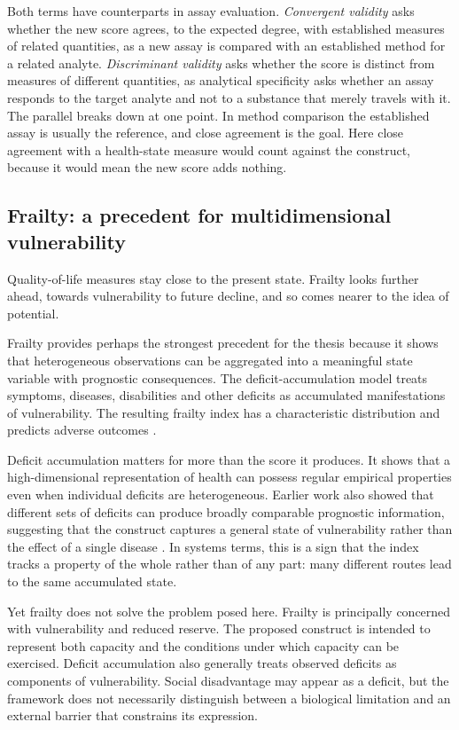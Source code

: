 Both terms have counterparts in assay evaluation. \emph{Convergent validity} asks whether the new score agrees, to the expected degree, with established measures of related quantities, as a new assay is compared with an established method for a related analyte. \emph{Discriminant validity} asks whether the score is distinct from measures of different quantities, as analytical specificity asks whether an assay responds to the target analyte and not to a substance that merely travels with it. The parallel breaks down at one point. In method comparison the established assay is usually the reference, and close agreement is the goal. Here close agreement with a health-state measure would count against the construct, because it would mean the new score adds nothing.

\subsection{Frailty: a precedent for multidimensional vulnerability}

Quality-of-life measures stay close to the present state. Frailty looks further ahead, towards vulnerability to future decline, and so comes nearer to the idea of potential.

Frailty provides perhaps the strongest precedent for the thesis because it shows that heterogeneous observations can be aggregated into a meaningful state variable with prognostic consequences. The deficit-accumulation model treats symptoms, diseases, disabilities and other deficits as accumulated manifestations of vulnerability. The resulting frailty index has a characteristic distribution and predicts adverse outcomes \citep{rockwood_mitnitski_2007}.

Deficit accumulation matters for more than the score it produces. It shows that a high-dimensional representation of health can possess regular empirical properties even when individual deficits are heterogeneous. Earlier work also showed that different sets of deficits can produce broadly comparable prognostic information, suggesting that the construct captures a general state of vulnerability rather than the effect of a single disease \citep{rockwood_mitnitski_2007}. In systems terms, this is a sign that the index tracks a property of the whole rather than of any part: many different routes lead to the same accumulated state.

Yet frailty does not solve the problem posed here. Frailty is principally concerned with vulnerability and reduced reserve. The proposed construct is intended to represent both capacity and the conditions under which capacity can be exercised. Deficit accumulation also generally treats observed deficits as components of vulnerability. Social disadvantage may appear as a deficit, but the framework does not necessarily distinguish between a biological limitation and an external barrier that constrains its expression.

